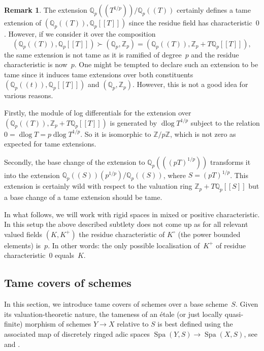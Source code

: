 \documentclass[a4paper,twoside,11pt,reqno]{amsart}
\renewcommand{\mathbb}{\mathds}
\newcommand{\bQ}{{\mathbb Q}}
\newcommand{\bZ}{{\mathbb Z}}
\DeclareMathOperator{\Spa}{Spa}
\DeclareMathOperator{\dlog}{dlog}
\theoremstyle{definition}
\newtheorem{rmk}[thm]{Remark}
\numberwithin{equation}{subsection}
\begin{document}
\begin{rmk}
    The extension $\bQ_p((T^{1/p}))/\bQ_p((T))$ certainly defines a tame extension of $(\bQ_p((T)),\bQ_p[[T]])$ since the residue field has characteristic~$0$.
    However, if we consider it over the composition
    \[
     (\bQ_p((T)),\bQ_p[[T]]) \succ (\bQ_p,\bZ_p) = (\bQ_p((T)),\bZ_p + T\bQ_p[[T]]),
    \]
    the same extension is not tame as it is ramified of degree~$p$ and the residue characteristic is now~$p$.
    One might be tempted to declare such an extension to be tame since it induces tame extensions over both constituents $(\bQ_p((t)),\bQ_p[[T]])$ and $(\bQ_p,\bZ_p)$.
    However, this is not a good idea for various reasons.

    Firstly, the module of log differentials for the extension over $(\bQ_p((T)),\bZ_p + T\bQ_p[[T]])$ is generated by $\dlog T^{1/p}$ subject to the relation $0 = \dlog T = p \dlog T^{1/p}$.
    So it is isomorphic to $\bZ/p\bZ$, which is not zero as expected for tame extensions.

    Secondly, the base change of the extension to $\bQ_p(((pT)^{1/p}))$ transforms it into the extension $\bQ_p((S))(p^{1/p})/\bQ_p((S))$, where $S = (pT)^{1/p}$.
    This extension is certainly wild with respect to the valuation ring $\bZ_p + T\bQ_p[[S]]$ but a base change of a tame extension should be tame.

    In what follows, we will work with rigid spaces in mixed or positive characteristic.
    In this setup the above described subtlety does not come up as for all relevant valued fields $(K,K^+)$ the residue characteristic of $K^\circ$ (the power bounded elements) is~$p$.
    In other words: the only possible localisation of~$K^+$ of residue characteristic~$0$ equals~$K$.
\end{rmk}


\subsection{Tame covers of schemes} 
\label{sec:adic tame discrete case}

In this section, we introduce tame covers of schemes over a base scheme~$S$.
Given its valuation-theoretic nature, the tameness of an \'etale (or just locally quasi-finite) morphism of schemes $Y\to X$ relative to $S$ is best defined using the associated map of discretely ringed adic spaces $\Spa(Y, S)\to \Spa(X, S)$, see \cite[\S3.1]{Temkin2011:RelativeRiemannZariskiSpacesa} and \cite{Hubner2021:AdicTameSite}.
\end{document}
